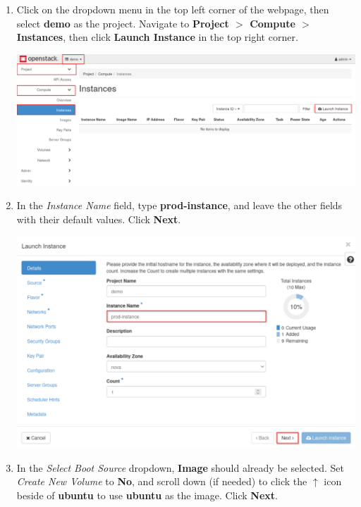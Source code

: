\documentclass[letterpaper, 12pt]{article}
\begin{document}
\begin{enumerate}
    \item Click on the dropdown menu in the top left corner of the webpage, then select \textbf{demo} as the project.
    Navigate to \textbf{Project $>$ Compute $>$ Instances}, then click \textbf{Launch Instance} in the top right corner.

    \begin{center}
        \includegraphics[width=\linewidth]{images/part1/step5.png}
    \end{center}

    \item In the \textit{Instance Name} field, type \textbf{prod-instance}, and leave the other fields with their default values.
    Click \textbf{Next}.

    \begin{center}
        \includegraphics[width=\linewidth]{images/part1/step6.png}
    \end{center}

    \item In the \textit{Select Boot Source} dropdown, \textbf{Image} should already be selected.
    Set \textit{Create New Volume} to \textbf{No}, and scroll down (if needed) to click the $\uparrow$ icon beside of \textbf{ubuntu} to use \textbf{ubuntu} as the image.
    Click \textbf{Next}.


\end{enumerate}
\end{document}
